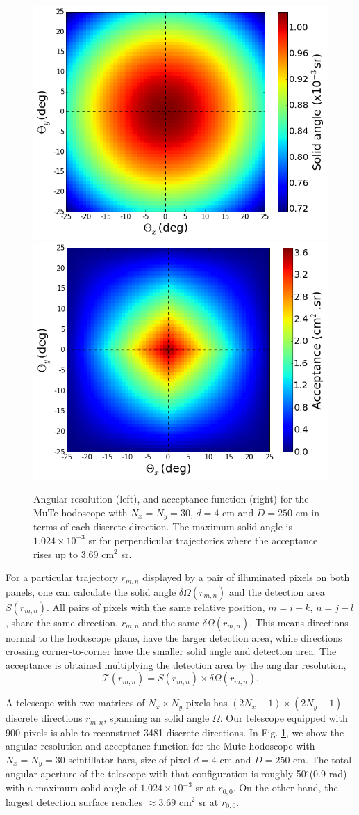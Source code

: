 \documentclass[letterpaper,11pt]{article}
\begin{document}
\begin{figure}[htb]
\centering
\includegraphics[width=0.48\columnwidth]{Figures/Solid_angle.png}
\includegraphics[width=0.48\columnwidth]{Figures/Aceptancia.png}
\caption{Angular resolution (left), and acceptance function (right) for the MuTe hodoscope with $N_x=N_y=30$, $d=4$ cm and $D=250$ cm in terms of each discrete direction. The maximum solid angle is $1.024\times 10^{-3}$ sr for perpendicular trajectories where the acceptance rises up to 3.69 cm$^{2}$ sr.}
\label{fig:acceptance}
\end{figure}

For a particular trajectory $r_{m,n}$ displayed by a pair of illuminated pixels on both panels, one can calculate the solid angle $\delta\Omega(r_{m,n})$ and the detection area $S(r_{m,n})$. All pairs of pixels with the same relative position, {$m=i-k$, $n=j-l$}, share the same direction, $r_{m,n}$ and the same $\delta\Omega(r_{m,n})$. This means directions normal to the hodoscope plane, have the larger detection area, while directions crossing corner-to-corner have the smaller solid angle and detection area. The acceptance is obtained \cite{LesparreEtal2010} multiplying the detection area by the angular resolution,
\begin{equation}
\mathcal{T}(r_{m,n})=S(r_{m,n})\times \delta\Omega(r_{m,n}).
\end{equation}

A telescope with two matrices of $N_x\times N_y$ pixels has $(2N_x-1)\times(2N_y-1)$ discrete directions $r_{m,n}$, spanning an solid angle $\Omega$. Our telescope equipped with 900 pixels is able to reconstruct 3481 discrete directions. In Fig. \ref{fig:acceptance}, we show the angular resolution and acceptance function for the Mute hodoscope with $N_x=N_y=30$ scintillator bars, size of pixel $d=4$ cm and $D=250$ cm. The total angular aperture of the telescope with that configuration is roughly 50$^{\circ}$(0.9 rad) with a maximum solid angle of $1.024\times 10^{-3}$ sr at $r_{0,0}$. On the other hand, the largest detection surface reaches $\approx 3.69$ cm$^{2}$ sr at $r_{0,0}$.
\end{document}
